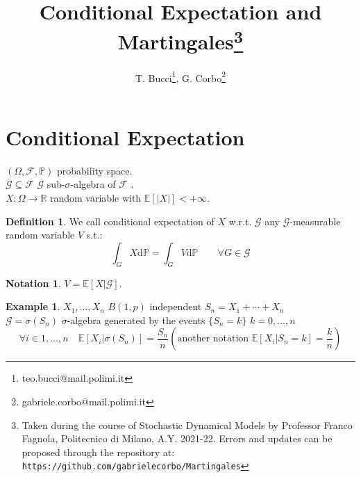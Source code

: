 \documentclass[10pt,a4paper]{article}
\title{Conditional Expectation and Martingales\footnote{Taken during the course of Stochastic Dynamical Models by Professor Franco Fagnola, Politecnico di Milano, A.Y. 2021-22. Errors and updates can be proposed through the repository at: \texttt{https://github.com/gabrielecorbo/Martingales}}}
\author{T. Bucci\footnote{teo.bucci@mail.polimi.it}, G. Corbo\footnote{gabriele.corbo@mail.polimi.it}}
\theoremstyle{definition}
\newtheorem{defi}{Definition}[section]
\newtheorem*{notat}{Notation}
\newtheorem{exi}{Example}[section]
\begin{document}
\maketitle
	\section{Conditional Expectation}
		$(\Omega,\mathcal{F},\mathbb{P})$  probability space. \\
		$\mathcal{G}\subseteq\mathcal{F}$           $ \mathcal{G}$ sub-$\sigma$-algebra of  $\mathcal{F} $ .\\
		$ X:\Omega\to\mathbb{R} $ random variable with $ \mathbb{E}[|X|]<+\infty .$
		\begin{defi}
			We call conditional expectation of $X$ w.r.t. $\mathcal{G}$ any $\mathcal{G}$-measurable random variable $ V $ s.t.:
			\begin{equation}
				\int_{G}X\mathrm{d}\mathbb{P} = \int_{G}V\mathrm{d}\mathbb{P}  \qquad    \forall G \in \mathcal{G}
			\end{equation}
		\end{defi}
		\begin{notat}
			$V=\mathbb{E}[X|\mathcal{G}]$.
		\end{notat}
	\begin{exi}
		$X_1,\ldots,X_n$  $B(1,p)$ independent $S_n= X_1+\cdots+X_n$ \\
		$\mathcal{G}=\sigma(S_n)$ $\sigma$-algebra generated by the events $ \{S_n=k\}$   $ k=0,\ldots,n$ 
		\begin{equation*}
			\forall i\in {1,\ldots,n}  \quad  \mathbb{E}[X_i|\sigma(S_n)]=\frac{S_n}{n}  \left(\text{another notation } \mathbb{E}[X_i|S_n=k]=\frac{k}{n}\right) 
		\end{equation*}
	\end{exi}
\end{document}
